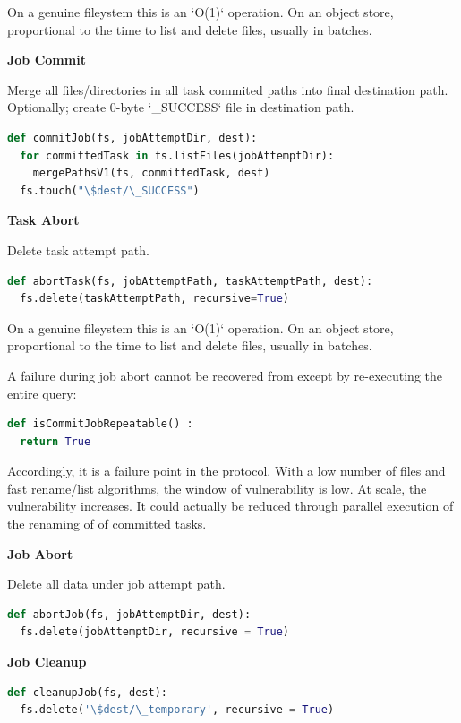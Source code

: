 \documentclass[conference]{IEEEtran}
\begin{document}
On a genuine fileystem this is an `O(1)` operation. On an object store,
proportional to the time to list and delete files, usually in batches.


\textbf{Job Commit}

Merge all files/directories in all task commited paths into final destination path.
Optionally; create 0-byte `\_SUCCESS` file in destination path.

\begin{lstlisting}[language=Python]
def commitJob(fs, jobAttemptDir, dest):
  for committedTask in fs.listFiles(jobAttemptDir):
    mergePathsV1(fs, committedTask, dest)
  fs.touch("\$dest/\_SUCCESS")
\end{lstlisting}


\textbf{Task Abort}

Delete task attempt path.

\begin{lstlisting}[language=Python]
def abortTask(fs, jobAttemptPath, taskAttemptPath, dest):
  fs.delete(taskAttemptPath, recursive=True)
\end{lstlisting}

On a genuine fileystem this is an `O(1)` operation. On an object store,
proportional to the time to list and delete files, usually in batches.


A failure during job abort cannot be recovered from except by re-executing
the entire query:

\begin{lstlisting}[language=Python]
def isCommitJobRepeatable() :
  return True
\end{lstlisting}

Accordingly, it is a failure point in the protocol. With a low number of files
and fast rename/list algorithms, the window of vulnerability is low. At
scale, the vulnerability increases. It could actually be reduced through
parallel execution of the renaming of of committed tasks.


\textbf{Job Abort}

Delete all data under job attempt path.

\begin{lstlisting}[language=Python]
def abortJob(fs, jobAttemptDir, dest):
  fs.delete(jobAttemptDir, recursive = True)
\end{lstlisting}

\textbf{Job Cleanup}

\begin{lstlisting}[language=Python]
def cleanupJob(fs, dest):
  fs.delete('\$dest/\_temporary', recursive = True)
\end{lstlisting}
\end{document}
